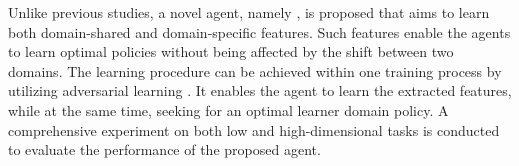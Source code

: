 Unlike previous studies, a novel agent, namely \DAIL{}, is proposed that aims to learn both domain-shared and domain-specific features.
Such features enable the agents to learn optimal policies without being affected by the shift between two domains.
The learning procedure can be achieved within one training process by utilizing adversarial learning \cite{GAN_Original}.
It enables the agent to learn the extracted features, while at the same time, seeking for an optimal learner domain policy.
A comprehensive experiment on both low and high-dimensional tasks is conducted to evaluate the performance of the proposed \DAIL{} agent.
